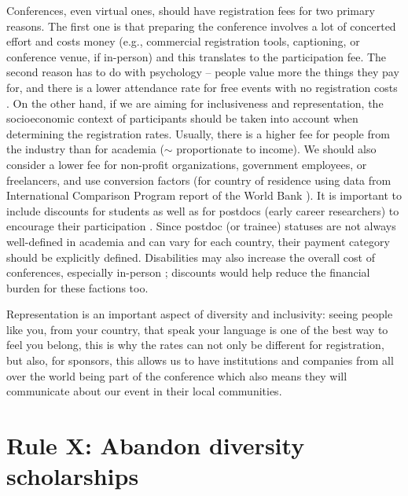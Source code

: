 \documentclass[10pt,letterpaper]{article}
\begin{document}
Conferences, even virtual ones, should have registration fees for two primary reasons. The first one is that preparing the conference involves a lot of concerted effort and costs money (e.g., commercial registration tools, captioning, or conference venue, if in-person) and this translates to the participation fee. The second reason has to do with psychology -- people value more the things they pay for, and there is a lower attendance rate for free events with no registration costs \cite{eventbrite_ultimate_2017}. On the other hand, if we are aiming for inclusiveness and representation, the socioeconomic context of participants should be taken into account when determining the registration rates. Usually, there is a higher fee for people from the industry than for academia ($\sim$ proportionate to income). We should also consider a lower fee for non-profit organizations, government employees, or freelancers, and use conversion factors (for country of residence using data from International Comparison Program report of the World Bank \cite{arend_disparity_2019}). It is important to include discounts for students as well as for postdocs (early career researchers) to encourage their participation \cite{sarabipour_evaluating_2020, andalib_postdoc_2018, kaplan_postdoc_2012}. Since postdoc (or trainee) statuses are not always well-defined in academia and can vary for each country, their payment category should be explicitly defined. Disabilities may also increase the overall cost of conferences, especially in-person \cite{de_picker_rethinking_2020, irish_increasing_2020}; discounts would help reduce the financial burden for these factions too.

Representation is an important aspect of diversity and inclusivity: seeing people like you, from your country, that speak your language is one of the best way to feel you belong, this is why the rates can not only be different for registration, but also, for sponsors, this allows us to have institutions and companies from all over the world being part of the conference which also means they will communicate about our event in their local communities.


\section{Rule X: Abandon diversity scholarships}
\end{document}
